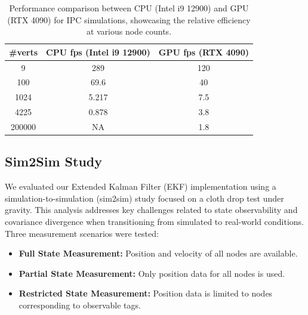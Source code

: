 \begin{table}
\centering
\begin{tabular}{|c|c|c|}
\hline
\textbf{\#verts} & \textbf{CPU fps (Intel i9 12900)} & \textbf{GPU fps (RTX 4090)} \\ \hline
9       & 289   & 120 \\ \hline
100     & 69.6  & 40  \\ \hline
1024    & 5.217 & 7.5 \\ \hline
4225    & 0.878 & 3.8 \\ \hline
200000  & NA     & 1.8 \\ \hline
\end{tabular}
\caption{Performance comparison between CPU (Intel i9 12900) and GPU (RTX 4090) for IPC simulations, showcasing the relative efficiency at various node counts.}
\label{tab:ipc_performance_comparison}
\end{table}

\subsection{Sim2Sim Study}

We evaluated our Extended Kalman Filter (EKF) implementation using a simulation-to-simulation (sim2sim) study focused on a cloth drop test under gravity. This analysis addresses key challenges related to state observability and covariance divergence when transitioning from simulated to real-world conditions. Three measurement scenarios were tested:

\begin{itemize}
    \item \textbf{Full State Measurement:} Position and velocity of all nodes are available.
    \item \textbf{Partial State Measurement:} Only position data for all nodes is used.
    \item \textbf{Restricted State Measurement:} Position data is limited to nodes corresponding to observable tags.
\end{itemize}

